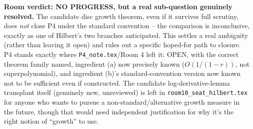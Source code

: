 \documentclass[11pt]{article}
\begin{document}
\textbf{Room verdict: NO PROGRESS, but a real sub-question genuinely resolved.} The candidate disc
growth theorem, even if it survives full scrutiny, does \emph{not} close P4 under the standard
convention -- the comparison is inconclusive, exactly as one of Hilbert's two branches anticipated.
This settles a real ambiguity (rather than leaving it open) and rules out a specific hoped-for path
to closure. P4 stands exactly where \texttt{P4\_note.tex}/Room 4 left it: OPEN, with the correct
theorem family named, ingredient (a) now precisely known ($O(1/(1-r))$, not superpolynomial), and
ingredient (b)'s standard-convention version now known not to be sufficient even if constructed.
The candidate log-derivative-lemma transplant itself (genuinely new, unreviewed) is left in
\texttt{room10\_seat\_hilbert.tex} for anyone who wants to pursue a non-standard/alternative growth
measure in the future, though that would need independent justification for why it's the right
notion of ``growth'' to use.
\end{document}
